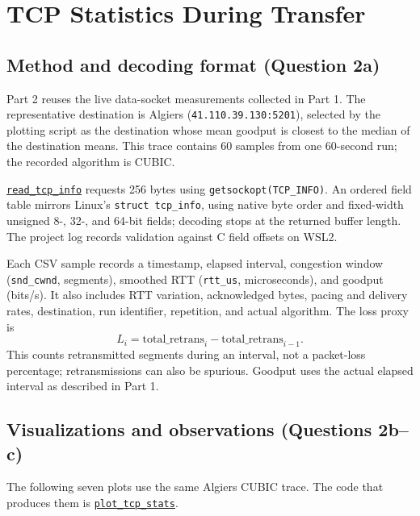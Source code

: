 \documentclass[11pt,letterpaper]{article}
\newcommand{\codelink}[2]{\href{https://github.com/RohMalpani/CS422Assignments/blob/main/assignment2/#2}{#1}}
\begin{document}
\clearpage\section{TCP Statistics During Transfer}

\subsection{Method and decoding format (Question 2a)}

Part 2 reuses the live data-socket measurements collected in Part 1. The
representative destination is Algiers (\texttt{41.110.39.130:5201}), selected
by the plotting script as the destination whose mean goodput is closest to the
median of the destination means. This trace contains 60 samples from one
60-second run; the recorded algorithm is CUBIC.

\codelink{\texttt{read\_tcp\_info}}{part1/goodput.py\#L32} requests 256 bytes
using \texttt{getsockopt(TCP\_INFO)}. An ordered field table mirrors Linux's
\texttt{struct tcp\_info}, using native byte order and fixed-width unsigned
8-, 32-, and 64-bit fields; decoding stops at the returned buffer length.
The project log records validation against C field offsets on WSL2.

Each CSV sample records a timestamp, elapsed interval, congestion window
(\texttt{snd\_cwnd}, segments), smoothed RTT (\texttt{rtt\_us}, microseconds),
and goodput (bits/s). It also includes RTT variation, acknowledged bytes,
pacing and delivery rates, destination, run identifier, repetition, and actual
algorithm. The loss proxy is
\[
L_i=\mathrm{total\_retrans}_i-\mathrm{total\_retrans}_{i-1}.
\]
This counts retransmitted segments during an interval, not a packet-loss
percentage; retransmissions can also be spurious. Goodput uses the actual
elapsed interval as described in Part 1.

\subsection{Visualizations and observations (Questions 2b--c)}
The following seven plots use the same Algiers CUBIC trace. The code that
produces them is
\codelink{\texttt{plot\_tcp\_stats}}{part2/plot_tcp_stats.py\#L72}.

\clearpage
\end{document}
